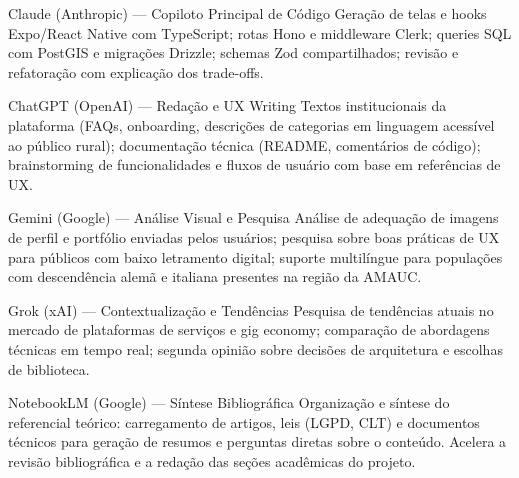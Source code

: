 \documentclass[12pt, a4paper]{article}
\begin{document}
\begin{techbox}{Claude (Anthropic) \cite{claude2024} --- Copiloto Principal de Código}
Geração de telas e hooks Expo/React Native com TypeScript; rotas Hono e
middleware Clerk; queries SQL com PostGIS e migrações Drizzle; schemas
Zod compartilhados; revisão e refatoração com explicação dos trade-offs.
\end{techbox}

\vspace{5pt}
\begin{techbox}{ChatGPT (OpenAI) \cite{chatgpt2024} --- Redação e UX Writing}
Textos institucionais da plataforma (FAQs, onboarding, descrições de
categorias em linguagem acessível ao público rural); documentação
técnica (README, comentários de código); brainstorming de funcionalidades
e fluxos de usuário com base em referências de UX.
\end{techbox}

\vspace{5pt}
\begin{techbox}{Gemini (Google) \cite{gemini2024} --- Análise Visual e Pesquisa}
Análise de adequação de imagens de perfil e portfólio enviadas pelos
usuários; pesquisa sobre boas práticas de UX para públicos com baixo
letramento digital; suporte multilíngue para populações com descendência
alemã e italiana presentes na região da AMAUC.
\end{techbox}

\vspace{5pt}
\begin{techbox}{Grok (xAI) \cite{grok2024} --- Contextualização e Tendências}
Pesquisa de tendências atuais no mercado de plataformas de serviços e
gig economy; comparação de abordagens técnicas em tempo real; segunda
opinião sobre decisões de arquitetura e escolhas de biblioteca.
\end{techbox}

\vspace{5pt}
\begin{techbox}{NotebookLM (Google) \cite{notebooklm2024} --- Síntese Bibliográfica}
Organização e síntese do referencial teórico: carregamento de artigos,
leis (LGPD, CLT) e documentos técnicos para geração de resumos e
perguntas diretas sobre o conteúdo. Acelera a revisão bibliográfica e a
redação das seções acadêmicas do projeto.
\end{techbox}

\vspace{5pt}

\end{document}
